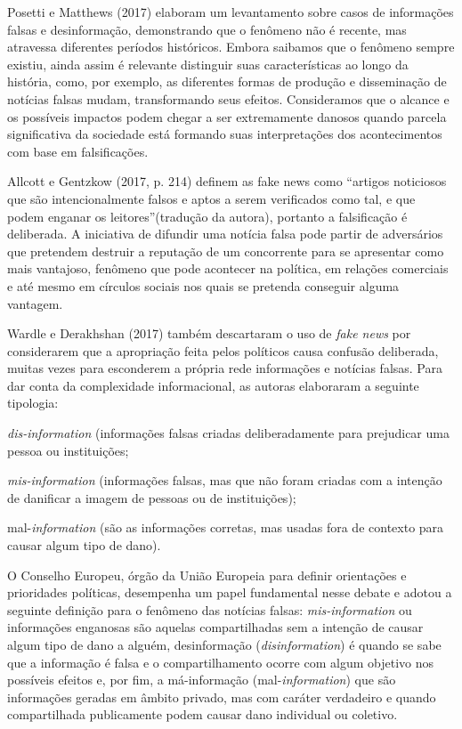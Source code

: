 Posetti e Matthews (2017) elaboram um levantamento sobre casos de
informações falsas e desinformação, demonstrando que o fenômeno não é
recente, mas atravessa diferentes períodos históricos. Embora saibamos
que o fenômeno sempre existiu, ainda assim é relevante distinguir suas
características ao longo da história, como, por exemplo, as diferentes
formas de produção e disseminação de notícias falsas mudam,
transformando seus efeitos. Consideramos que o alcance e os possíveis
impactos podem chegar a ser extremamente danosos quando parcela
significativa da sociedade está formando suas interpretações dos
acontecimentos com base em falsificações.

Allcott e Gentzkow (2017, p. 214) definem as fake news como ``artigos
noticiosos que são intencionalmente falsos e aptos a serem verificados
como tal, e que podem enganar os leitores''(tradução da autora),
portanto a falsificação é deliberada. A iniciativa de difundir uma
notícia falsa pode partir de adversários que pretendem destruir a
reputação de um concorrente para se apresentar como mais vantajoso,
fenômeno que pode acontecer na política, em relações comerciais e até
mesmo em círculos sociais nos quais se pretenda conseguir alguma
vantagem.

Wardle e Derakhshan (2017) também descartaram o uso de \emph{fake news}
por considerarem que a apropriação feita pelos políticos causa confusão
deliberada, muitas vezes para esconderem a própria rede informações e
notícias falsas. Para dar conta da complexidade informacional, as
autoras elaboraram a seguinte tipologia:

\emph{dis-information} (informações falsas criadas deliberadamente para
prejudicar uma pessoa ou instituições;

\emph{mis-information} (informações falsas, mas que não foram criadas
com a intenção de danificar a imagem de pessoas ou de instituições);

mal-\emph{information} (são as informações corretas, mas usadas fora de
contexto para causar algum tipo de dano).

O Conselho Europeu, órgão da União Europeia para definir orientações e
prioridades políticas, desempenha um papel fundamental nesse debate e
adotou a seguinte definição para o fenômeno das notícias falsas:
\emph{mis-information} ou informações enganosas são aquelas
compartilhadas sem a intenção de causar algum tipo de dano a alguém,
desinformação (\emph{disinformation}) é quando se sabe que a informação
é falsa e o compartilhamento ocorre com algum objetivo nos possíveis
efeitos e, por fim, a má-informação (mal-\emph{information}) que são
informações geradas em âmbito privado, mas com caráter verdadeiro e
quando compartilhada publicamente podem causar dano individual ou
coletivo.

